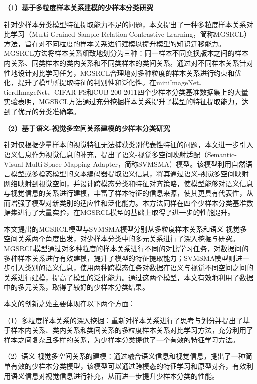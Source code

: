 \textbf{（1）基于多粒度样本关系建模的少样本分类研究}

针对少样本分类模型特征提取能力不足的问题，本文提出了一种多粒度样本关系对比学习（Multi-Grained Sample Relation Contrastive Learning，简称MGSRCL）方法，旨在对不同粒度的样本关系进行建模以提升模型的知识迁移能力。MGSRCL方法将样本关系细致地划分为三种：同一样本不同变换版本之间的样本内关系、同类样本的类内关系和不同类样本的类间关系。通过对不同样本关系针对性地设计对比学习任务，MGSRCL合理地对多种粒度的样本关系进行约束和优化，提升了模型所提取特征的判别性和泛化性。在miniImageNet\cite{vinyals2016matching}、tierdImageNet\cite{ren2018meta}、CIFAR-FS\cite{bertinetto2019meta}和CUB-200-2011\cite{wah2011caltech}四个少样本分类基准数据集上的大量实验表明，MGSRCL方法通过充分挖掘样本关系提升了模型的特征提取能力，达到了优异的分类准确率。

\textbf{（2）基于语义-视觉多空间关系建模的少样本分类研究}

针对仅根据少量样本的视觉特征无法捕获类别代表性特征的问题，本文进一步引入语义信息作为视觉信息的补充，提出了语义-视觉多空间映射适配（Semantic-Visual Multi-Space Mapping Adapter，简称SVMSMA）模型。该模型利用自然语言模型或多模态模型的文本编码器提取语义信息，将其通过语义-视觉多空间映射网络映射到视觉空间，并设计跨模态分类和特征对齐策略，使模型能够对语义信息与视觉信息的关系进行建模，丰富了样本特征的信息来源，使其更具有代表性，从而增强了模型对新类别的适应性和泛化能力。本方法同样在四个少样本分类基准数据集进行了大量实验，在MGSRCL模型的基础上取得了进一步的性能提升。

本文提出的MGSRCL模型与SVMSMA模型分别从多粒度样本关系和语义-视觉多空间关系两个角度出发，对少样本分类中的多元关系进行了深入挖掘与研究。MGSRCL模型通过对多种粒度的样本关系进行不同的对比学习任务，对数据间的多种样本关系进行有效建模，提升了模型的特征提取能力；SVMSMA模型则进一步引入类别的语义信息，使用两种跨模态任务对数据在语义与视觉不同空间之间的关系进行建模，提高了模型的泛化能力。通过这两个模型，本文有效地利用了数据中的多元关系，取得了较好的少样本分类结果。

本文的创新之处主要体现在以下两个方面：

（1）多粒度样本关系的深入挖掘：重新对样本关系进行了思考与划分并提出了基于样本内关系、类内关系和类间关系的多粒度样本关系对比学习方法，充分利用了样本之间复杂且多样的关系，为少样本分类提供了一个有效的特征学习方法。

（2）语义-视觉多空间关系的建模：通过融合语义信息和视觉信息，提出了一种简单有效的少样本分类模型，该模型可以通过跨模态的特征学习和原型对齐，有效利用语义信息对视觉信息进行补充，从而进一步提升少样本分类的性能。

